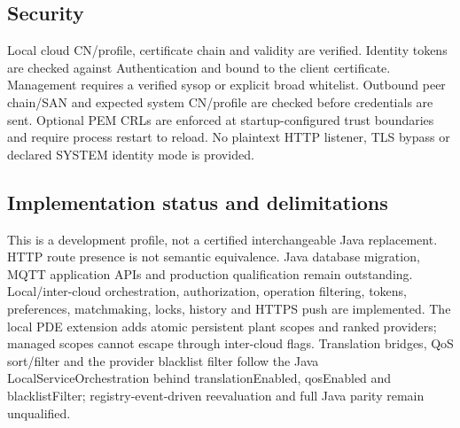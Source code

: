 \documentclass[a4paper]{arrowhead}
\begin{document}
\subsection{Security}
Local cloud CN/profile, certificate chain and validity are verified. Identity tokens are checked against Authentication and bound to the client certificate. Management requires a verified sysop or explicit broad whitelist. Outbound peer chain/SAN and expected system CN/profile are checked before credentials are sent. Optional PEM CRLs are enforced at startup-configured trust boundaries and require process restart to reload. No plaintext HTTP listener, TLS bypass or declared SYSTEM identity mode is provided.
\subsection{Implementation status and delimitations}
This is a development profile, not a certified interchangeable Java replacement. HTTP route presence is not semantic equivalence. Java database migration, MQTT application APIs and production qualification remain outstanding.
Local/inter-cloud orchestration, authorization, operation filtering, tokens, preferences, matchmaking, locks, history and HTTPS push are implemented. The local PDE extension adds atomic persistent plant scopes and ranked providers; managed scopes cannot escape through inter-cloud flags. Translation bridges, QoS sort/filter and the provider blacklist filter follow the Java LocalServiceOrchestration behind translationEnabled, qosEnabled and blacklistFilter; registry-event-driven reevaluation and full Java parity remain unqualified.
\clearpage
\end{document}
